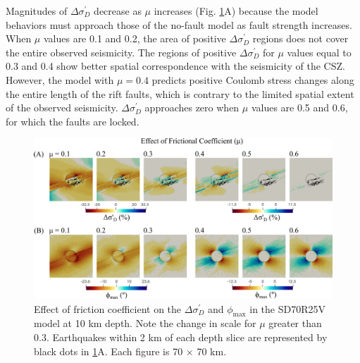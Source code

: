 \documentclass[draft]{agujournal2018}
\begin{document}
Magnitudes of $\Delta\sigma_{D}^{\prime}$ decrease as $\mu$ increases (Fig. \ref{fig:eff_of_mu}A) because the model behaviors must approach those of the no-fault model as fault strength increases. When $\mu$ values are 0.1 and 0.2, the area of positive $\Delta\sigma_{D}^{\prime}$ regions does not cover the entire observed seismicity. The regions of positive $\Delta\sigma_{D}^{\prime}$ for $\mu$ values equal to 0.3 and 0.4 show better spatial correspondence with the seismicity of the CSZ. However, the model with $\mu = 0.4$ predicts positive Coulomb stress changes along the entire length of the rift faults, which is contrary to the limited spatial extent of the observed seismicity.  $\Delta\sigma_{D}^{\prime}$ approaches zero when $\mu$ values are 0.5 and 0.6, for which the faults are locked. 

\begin{figure}[ht]
\centering
\includegraphics[width=30pc]{Figures/SD70R25V_2.png}
\caption{Effect of friction coefficient on the $\Delta\sigma_{D}^{\prime}$ and $\phi_{\max}$ in the SD70R25V model at 10 km depth. Note the change in scale for $\mu$ greater than 0.3. Earthquakes within 2 km of each depth slice are represented by black dots in \ref{fig:eff_of_mu}A.  Each figure is 70 $\times$ 70 km.} 
\label{fig:eff_of_mu}
\end{figure}
\end{document}
